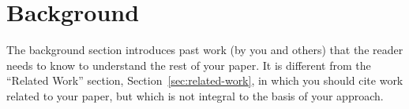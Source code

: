 \section{Background}
\label{sec:background}

The background section introduces past work (by you
and others) that the reader needs to know to understand 
the rest of your paper. 
%
It is different from the ``Related Work'' section, 
Section~\ref{sec:related-work},
in which you should cite work related to your paper,
but which is not integral to the basis of your approach.




